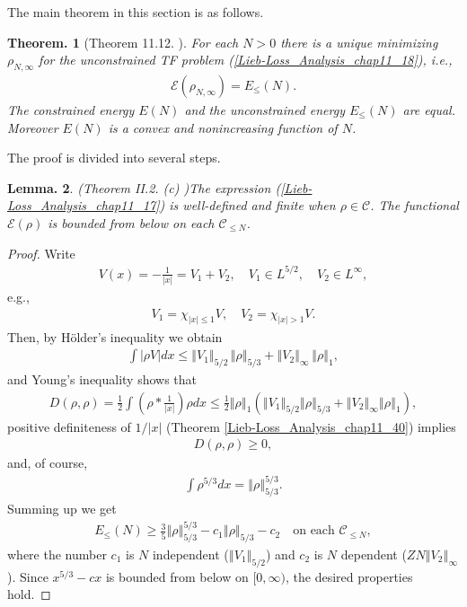 \documentclass[openany, a4paper, oneside]{book}
\theoremstyle{break}
\newtheorem{thm}{Theorem.}[section]
\newtheorem{lem}[thm]{Lemma.}
\theoremstyle{breakdefn}
\newcommand{\abs}[1]{\left|#1\right|}
\newcommand{\norm}[1]{\left\Vert#1\right\Vert}
\newcommand{\rbk}[1]{\left (#1\right)}
\newcommand{\calC}{\mathcal{C}}
\newcommand{\calE}{\mathcal{E}}
\newcommand{\EleqN}{E_{\leq}(N)}
\newcommand{\rhoNinfty}{\rho_{N, \infty}}
\begin{document}
The main theorem in this section is as follows.
\begin{thm}[Theorem 11.12. \cite{LiebLoss1}]\label{Lieb-Loss_Analysis_chap11_33}
 For each $N > 0$ there is a unique minimizing $\rhoNinfty$ for the unconstrained TF problem (\ref{Lieb-Loss_Analysis_chap11_18}), i.e.,
 \begin{align}
  \calE \rbk{\rhoNinfty}
  =
  E_{\leq} (N).
 \end{align}
 The constrained energy $E (N)$ and the unconstrained energy $E_{\leq} (N)$ are equal.
 Moreover $E (N)$ is a convex and nonincreasing function of $N$.
\end{thm}
The proof is divided into several steps.
\begin{lem}\textup{(Theorem II.2. (c) \cite{LiebSimon1})}\label{Lieb-Loss_Analysis_chap11_19}
 The expression \textup{(\ref{Lieb-Loss_Analysis_chap11_17})} is well-defined and finite when $\rho \in \calC$.
 The functional $\calE \rbk{\rho}$ is bounded from below on each $\calC_{\leq N}$.
\end{lem}
\begin{proof}
Write
\begin{align}
 V (x)
 =
 -\frac{1}{\abs{x}}
 =
 V_1 + V_2, \quad V_1 \in L^{5/2}, \quad V_2 \in L^{\infty},
\end{align}
e.g.,
\begin{align}
 V_1 = \chi_{\abs{x} \leq 1} V, \quad
 V_2 = \chi_{\abs{x} > 1} V.
\end{align}
Then, by H\"older's inequality we obtain
\begin{align}
 \int \abs{\rho V} dx
 \leq
 \norm{V_1}_{5/2} \, \norm{\rho}_{5/3} + \norm{V_2}_{\infty} \, \norm{\rho}_1,
\end{align}
and Young's inequality shows that
\begin{align}
 D (\rho, \rho)
 =
 \frac{1}{2} \int \rbk{\rho * \frac{1}{\abs{x}}} \rho dx
 \leq
 \frac{1}{2} \norm{\rho}_1 \rbk{\norm{V_1}_{5/2} \norm{\rho}_{5/3} + \norm{V_2}_{\infty} \norm{\rho}_1},
\end{align}
positive definiteness of $1/\abs{x}$ (Theorem \ref{Lieb-Loss_Analysis_chap11_40}) implies
\begin{align}
 D (\rho, \rho)
 \geq 0,
\end{align}
and, of course,
\begin{align}
 \int \rho^{5/3} dx
 =
 \norm{\rho}_{5/3}^{5/3}.
\end{align}
Summing up we get
\begin{align}
 \EleqN
 \geq
 \frac{3}{5} \norm{\rho}_{5/3}^{5/3} - c_1 \norm{\rho}_{5/3} - c_2 \quad \text{on each } \calC_{\leq N}, \label{Lieb-Loss_Analysis_chap11_21}
\end{align}
where the number $c_1$ is $N$ independent ($\norm{V_1}_{5/2}$) and $c_2$ is $N$ dependent ($ZN \norm{V_2}_{\infty}$).
Since $x^{5/3} - c x$ is bounded from below on $[0, \infty)$, the desired properties hold.
\end{proof}
\end{document}
